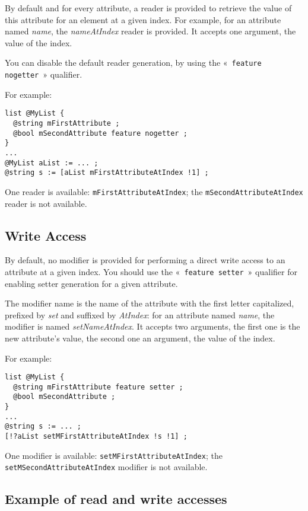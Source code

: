By default and for every attribute, a reader is provided to retrieve the value of this attribute for an element at a given index. For example, for an attribute named \emph{name}, the \emph{nameAtIndex} reader is provided. It accepts one  argument, the value of the index.

You can disable the default reader generation, by using the «~\lstinline[language=galgas]!feature nogetter!~» qualifier.

For example:
\begin{lstlisting}[language=galgas]
list @MyList {
  @string mFirstAttribute ;
  @bool mSecondAttribute feature nogetter ;
}
...
@MyList aList := ... ;
@string s := [aList mFirstAttributeAtIndex !1] ;
\end{lstlisting}

One reader is available: \lstinline[language=galgas]!mFirstAttributeAtIndex!; the \lstinline[language=galgas]!mSecondAttributeAtIndex! reader is not available.


\subsection{Write Access}

By default, no modifier is provided for performing a direct write access to an attribute at a given index. You should use the «~\lstinline[language=galgas]!feature setter!~» qualifier for enabling setter generation for a given attribute.

The modifier name is the name of the attribute with the first letter capitalized, prefixed by \emph{set} and suffixed by \emph{AtIndex}: for an attribute named \emph{name}, the modifier is named \emph{setNameAtIndex}. It accepts two arguments, the first one is the new attribute's value, the second one an  argument, the value of the index.

For example:

\begin{lstlisting}[language=galgas]
list @MyList {
  @string mFirstAttribute feature setter ;
  @bool mSecondAttribute ;
}
...
@string s := ... ;
[!?aList setMFirstAttributeAtIndex !s !1] ;
\end{lstlisting}

One modifier is available: \lstinline[language=galgas]!setMFirstAttributeAtIndex!; the \lstinline[language=galgas]!setMSecondAttributeAtIndex! modifier is not available.

\subsection{Example of read and write accesses}

